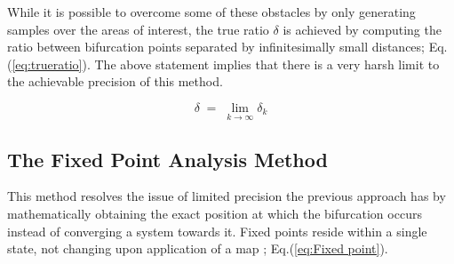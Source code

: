 \begin{table}[h]
\centering
{}
\caption{The ratio $\delta_k$ as estimated from data gathered by measuring the distance between points in Fig.(\ref{fig:feigen1}). Best estimation is
4.920 which hint towards the true value of 4.669.}
\label{tab:feigentable1}
\end{table}

While it is possible to overcome some of these obstacles by only generating samples over
the areas of interest, the true ratio $\delta$ is achieved by computing the ratio between
bifurcation points separated by infinitesimally small distances; Eq.(\ref{eq:trueratio}).
The above statement implies that there is a very harsh limit to the achievable precision
of this method.

\begin{equation}
    \label{eq:trueratio}
    \delta\; = \; \lim_{k \to \infty} \delta_k
\end{equation}

\subsection{The Fixed Point Analysis Method}

This method resolves the issue of limited precision the previous approach has
by mathematically obtaining the exact position at which the bifurcation occurs
instead of converging a system towards it. Fixed points reside within a single
state, not changing upon application of a map \cite{chaosatwolfram2};
Eq.(\ref{eq:Fixed point}).

